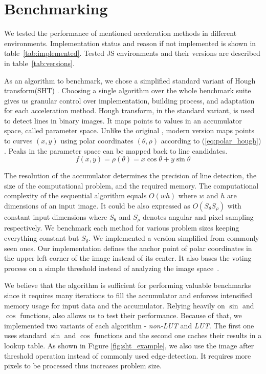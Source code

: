 \section{Benchmarking}\label{sec:benchmarking}

We tested the performance of mentioned acceleration methods in different environments. Implementation status and reason if not implemented is shown in table~\ref{tab:implemented}. Tested JS environments and their versions are described in table~\ref{tab:versions}.


As an algorithm to benchmark, we chose a simplified standard variant of Hough transform(SHT) \cite{mukhopadhyay2015survey}. Choosing a single algorithm over the whole benchmark suite gives us granular control over implementation, building process, and adaptation for each acceleration method. Hough transform, in the standard variant, is used to detect lines in binary images. It maps points to values in an accumulator space, called parameter space. Unlike the original \cite{hough1962method}, modern version maps points to curves $(x, y)$ using polar coordinates $(\theta, \rho)$ according to (\ref{eq:polar_hough}) \cite{duda1972use}.
Peaks in the parameter space can be mapped back to line candidates.
\begin{equation}
    \label{eq:polar_hough}
    f(x,y) = \rho(\theta) = x\cos{\theta}+y\sin{\theta}
\end{equation}


The resolution of the accumulator determines the precision of line detection, the size of the computational problem, and the required memory. The computational complexity of the sequential algorithm equals $O(wh)$ where $w$ and $h$ are dimensions of an input image. It could be also expressed as $O(S_{\theta} S_\rho)$ with constant input dimensions where $S_{\theta}$ and $S_\rho$ denotes angular and pixel sampling respectively. We benchmark each method for various problem sizes keeping everything constant but $S_\theta$. We implemented a version simplified from commonly seen ones. Our implementation defines the anchor point of polar coordinates in the upper left corner of the image instead of its center. It also bases the voting process on a simple threshold instead of analyzing the image space~\cite{palmer1997optimizing}.


We believe that the algorithm is sufficient for performing valuable benchmarks since it requires many iterations to fill the accumulator and enforces intensified memory usage for input data and the accumulator. Relying heavily on $\sin$ and $\cos$ functions, also allows us to test their performance. Because of that, we implemented two variants of each algorithm - \textit{non-LUT} and \textit{LUT}. The first one uses standard $\sin$ and $\cos$ functions and the second one caches their results in a lookup table. As shown in Figure \ref{fig:sht_example}, we also use the image after threshold operation instead of commonly used edge-detection. It requires more pixels to be processed thus increases problem size.


